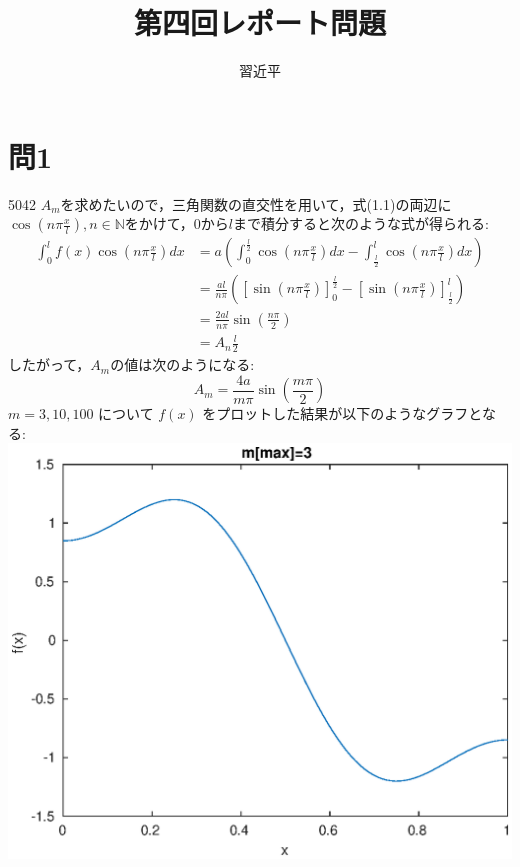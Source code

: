 \documentclass{jreport}
\begin{document}
\title{第四回レポート問題}
\author{習近平}
\setcounter{chapter}{4}
\maketitle
\newpage
\tableofcontents
\newpage
\section{問1}
5042
$A_m$を求めたいので，三角関数の直交性を用いて，式(1.1)の両辺に$\cos \left(n \pi \frac{x}{l} \right),n \in \mathbb{N}$をかけて，$0$から$l$まで積分すると次のような式が得られる:
\begin{equation}
	\begin{aligned}
		\int_0^l f(x) \cos \left( n \pi \frac{x}{l} \right) dx &=a \left( \int_0^{\frac{l}{2}} \cos\left(n \pi \frac{x}{l} \right) dx  - \int_{\frac{l}{2}}^l \cos\left(n \pi \frac{x}{l}\right) dx \right) \\
&= \frac{al}{n\pi} \left( \left[ \sin\left(n\pi \frac{x}{l} \right) \right]_0^{\frac{l}{2}} - \left[ \sin\left(n\pi \frac{x}{l} \right) \right]_{\frac{l}{2}}^l \right) \\
&= \frac{2al}{n \pi} \sin\left(\frac{n\pi}{2} \right)\\
&= A_n \frac{l}{2}
	\end{aligned}
\end{equation}
したがって，$A_m$の値は次のようになる:
$$
A_m = \frac{4a}{m\pi} \sin \left( \frac{m\pi}{2} \right)
$$
$ m=3,10,100 $ について $ f(x) $ をプロットした結果が以下のようなグラフとなる:
\includegraphics[scale=0.3]{1_3.eps}
\end{document}
